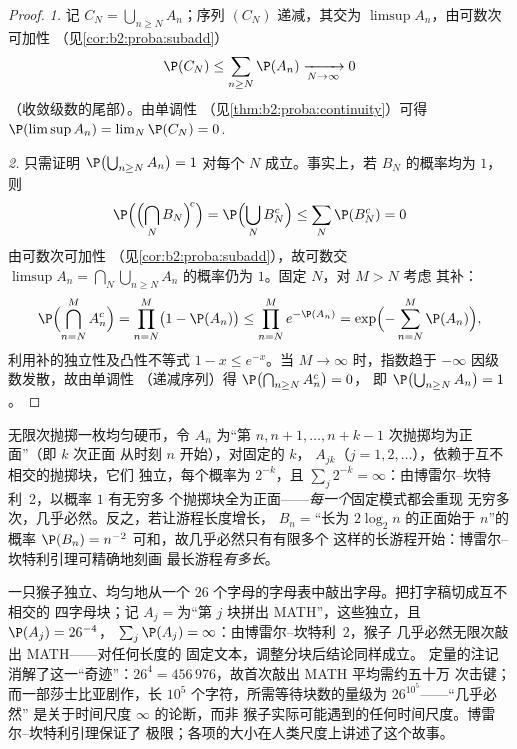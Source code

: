 \begin{proof}
\emph{1.} 记 $C_N = \bigcup_{n \geq N}A_n$；序列 $(C_N)$
递减，其交为 $\limsup A_n$，由可数次可加性
（见\cref{cor:b2:proba:subadd}）
\[
\P(C_N) \leq \sum_{n \geq N}\P(A_n)
\xrightarrow[N\to\infty]{} 0
\]
（收敛级数的尾部）。由单调性
（见\cref{thm:b2:proba:continuity}）可得 $\P(\limsup A_n) =
\lim_N \P(C_N) = 0$.

\emph{2.} 只需证明 $\P\bigl(\bigcup_{n\geq N}A_n\bigr)
= 1$ 对每个 $N$ 成立。事实上，若 $B_N$ 的概率均为
$1$，则
\[
\P\Bigl(\Bigl(\bigcap_NB_N\Bigr)^{\!c}\Bigr)
= \P\Bigl(\bigcup_NB_N^c\Bigr)
\leq \sum_N\P(B_N^c) = 0
\]
由可数次可加性
（见\cref{cor:b2:proba:subadd}），故可数交
$\limsup A_n = \bigcap_N\bigcup_{n\geq N}A_n$ 的概率仍为
$1$。固定 $N$，对 $M > N$ 考虑
其补：
\[
\P\Bigl(\bigcap_{n=N}^{M} A_n^c\Bigr)
= \prod_{n=N}^{M}\bigl(1 - \P(A_n)\bigr)
\leq \prod_{n=N}^{M} e^{-\P(A_n)}
= \exp\Bigl(-\sum_{n=N}^M \P(A_n)\Bigr) ,
\]
利用补的独立性及凸性不等式 $1 -
x \leq e^{-x}$。当 $M \to \infty$ 时，指数趋于 $-\infty$
因级数发散，故由单调性
（递减序列）得 $\P\bigl(\bigcap_{n \geq N}A_n^c\bigr) = 0$，
即 $\P\bigl(\bigcup_{n \geq N}A_n\bigr) = 1$。
\end{proof}

\begin{example}[无穷多段连续正面]\label{ex:b2:proba:runs}
无限次抛掷一枚均匀硬币，令 $A_n$ 为“第 $n,
n+1, \dots, n + k - 1$ 次抛掷均为正面”（即 $k$ 次正面
从时刻 $n$ 开始），对固定的 $k$， $A_{jk}$（$j =
1, 2, \dots$），依赖于互不相交的抛掷块，它们
独立，每个概率为 $2^{-k}$，且 $\sum_j 2^{-k} =
\infty$：由博雷尔--坎特利~2，以概率 $1$ 有无穷多
个抛掷块全为正面——\emph{每一个}固定模式都会重现
无穷多次，几乎必然。反之，若让游程长度增长，
$B_n = {}$“长为 $2\log_2 n$ 的正面始于
$n$”的概率 $\P(B_n) = n^{-2}$ 可和，故几乎必然只有有限多个
这样的长游程开始：博雷尔--坎特利引理可精确地刻画
最长游程\emph{有多长}。
\end{example}

\begin{example}
一只猴子独立、均匀地从一个
$26$ 个字母的字母表中敲出字母。把打字稿切成互不相交的
四字母块；记 $A_j = {}$为“第 $j$ 块拼出
MATH”，这些独立，且 $\P(A_j) = 26^{-4}$，
$\sum_j\P(A_j) = \infty$：由博雷尔--坎特利~2，猴子
几乎必然无限次敲出 MATH——对任何长度的
固定文本，调整分块后结论同样成立。
定量的注记消解了这一“奇迹”：$26^4 =
456\,976$，故首次敲出 MATH 平均需约五十万
次击键；而一部莎士比亚剧作，长 $10^5$
个字符，所需等待块数的量级为 $26^{10^5}$——“几乎必然”
是关于时间尺度 $\infty$ 的论断，而非
猴子实际可能遇到的任何时间尺度。博雷尔--坎特利引理保证了
极限；各项的大小在人类尺度上讲述了这个故事。
\end{example}

